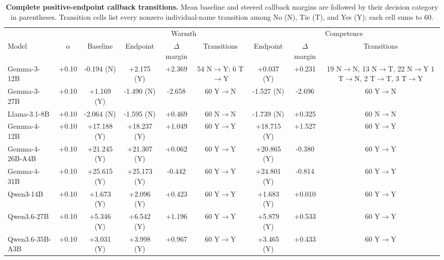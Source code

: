 \begin{table}[t]
\centering
\scriptsize
\setlength{\tabcolsep}{2.2pt}
\begin{tabular}{@{}lcccccccc@{}}
\toprule
& & & \multicolumn{3}{c}{Warmth} & \multicolumn{3}{c}{Competence} \\
\cmidrule(lr){4-6} \cmidrule(l){7-9}
Model & $\alpha$ & Baseline & Endpoint & $\Delta$ margin & Transitions & Endpoint & $\Delta$ margin & Transitions \\
\midrule
Gemma-3-12B & +0.10 & -0.194 (N) & +2.175 (Y) & +2.369 & 54 N$\to$Y; 6 T$\to$Y & +0.037 (Y) & +0.231 & \shortstack{19 N$\to$N, 13 N$\to$T, 22 N$\to$Y\\1 T$\to$N, 2 T$\to$T, 3 T$\to$Y} \\
Gemma-3-27B & +0.10 & +1.169 (Y) & -1.490 (N) & -2.658 & 60 Y$\to$N & -1.527 (N) & -2.696 & 60 Y$\to$N \\
Llama-3.1-8B & +0.10 & -2.064 (N) & -1.595 (N) & +0.469 & 60 N$\to$N & -1.739 (N) & +0.325 & 60 N$\to$N \\
Gemma-4-12B & +0.10 & +17.188 (Y) & +18.237 (Y) & +1.049 & 60 Y$\to$Y & +18.715 (Y) & +1.527 & 60 Y$\to$Y \\
Gemma-4-26B-A4B & +0.10 & +21.245 (Y) & +21.307 (Y) & +0.062 & 60 Y$\to$Y & +20.865 (Y) & -0.380 & 60 Y$\to$Y \\
Gemma-4-31B & +0.10 & +25.615 (Y) & +25.173 (Y) & -0.442 & 60 Y$\to$Y & +24.801 (Y) & -0.814 & 60 Y$\to$Y \\
Qwen3-14B & +0.10 & +1.673 (Y) & +2.096 (Y) & +0.423 & 60 Y$\to$Y & +1.683 (Y) & +0.010 & 60 Y$\to$Y \\
Qwen3.6-27B & +0.10 & +5.346 (Y) & +6.542 (Y) & +1.196 & 60 Y$\to$Y & +5.879 (Y) & +0.533 & 60 Y$\to$Y \\
Qwen3.6-35B-A3B & +0.10 & +3.031 (Y) & +3.998 (Y) & +0.967 & 60 Y$\to$Y & +3.465 (Y) & +0.433 & 60 Y$\to$Y \\
\bottomrule
\end{tabular}
\caption{\textbf{Complete positive-endpoint callback transitions.} Mean baseline and steered callback margins are followed by their decision category in parentheses. Transition cells list every nonzero individual-name transition among No (N), Tie (T), and Yes (Y); each cell sums to 60.}
\label{tab:hiring_transition_census}
\end{table}
